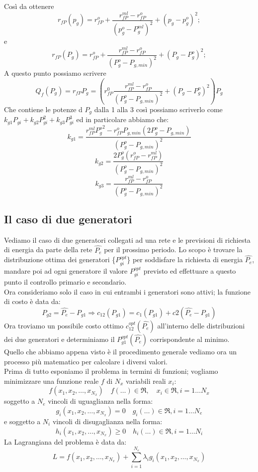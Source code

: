 Così da ottenere 
$$
r_{fP}(p_g)= r_{fP}^o+\frac{r_{fP}^{ml}-r_{fP}^o}{(p_g^o-P_g^{ml})^2}+(p_g-p_{g}^o)^2;
$$
e
$$
r_{fP}(P_g)= r_{fP}^o+\frac{r_{fP}^{ml}-r_{fP}^o}{(P_g^o-P_{g,min})^2}+(P_g-P_{g}^o)^2;
$$
A questo punto possiamo scrivere 
$$
Q_f(P_g)=r_{fP}P_g=\left (r_{fP}^0\frac{r_{fP}^{ml}-r_{fP}^o}{(P_g^o-P_{g,min})^2}+(P_g-P_{g}^o)^2\right ) P_g
$$
Che contiene le potenze d $P_g$ dalla 1 alla 3 così possiamo scriverlo come $k_{g1}P_{gi}+k_{g2}P_{gi}^2+k_{g3}P_{gi}^3$ ed in particolare abbiamo che:
$$
k_{g1}=\frac{r_{fP}^{ml}{P^o_g}^2-r_{fP}^oP_{g,min}(2P^o_g-P_{g,min})}{(P^o_g-P_{g,min})^2}
$$
$$
k_{g2}=\frac{2P^o_g(r_{fP}^{o}-r_{fP}^{ml})}{(P^o_g-P_{g,min})^2}
$$
$$
k_{g3}=\frac{r_{fP}^{ml}-r_{fP}^{o}}{(P^o_g-P_{g,min})^2}
$$

\subsection{Il caso di due generatori}
Vediamo il caso di due generatori collegati ad una rete e le previsioni di richiesta di energia da parte della rete $\hat{P_e}$ per il prossimo periodo. Lo scopo è trovare la distribuzione ottima dei generatori \{$P_{gi}^{opt}$\} per soddisfare la richiesta di energia $\hat{P_e}$, mandare poi ad ogni generatore il valore $P_{gi}^{opt}$ previsto ed effettuare a questo punto il controllo primario e secondario.\\
Ora consideriamo solo il caso in cui entrambi i generatori sono attivi; la funzione di costo è data da:
$$P_{g2}=\hat{P_e}-P_{g1} \Rightarrow c_{12}(P_{g1})= c_1(P_{g1})+c2(\hat{P_e}-P_{g1})$$
Ora troviamo un possibile costo ottimo $c_{12}^{opt}(\hat{P_e})$ all'interno delle distribuzioni dei due generatori e determiniamo il $P_{g1}^{opt}(\hat{P_e})$ corrispondente al minimo.\\
Quello che abbiamo appena visto è il procedimento generale vediamo ora un processo più matematico per calcolare i diversi valori.\\
Prima di tutto esponiamo il problema in termini di funzioni; vogliamo minimizzare una funzione reale $f$ di $N_x$ variabili reali $x_i$:
$$f(x_1,x_2,\dots,x_{N_x})\quad f(\dots)\in \Re,\quad x_i\in\Re, i=1\dots N_x$$
soggetto a $N_e$ vincoli di uguaglianza nella forma:
$$g_i(x_1,x_2,\dots,x_{N_x})=0\quad g_i(\dots)\in \Re, i=1\dots N_e$$
e soggetto a $N_i$ vincoli di disugaglianza nella forma:
$$h_i(x_1,x_2,\dots,x_{N_x})\geq 0\quad h_i(\dots)\in\Re, i=1\dots N_i$$
La Lagrangiana del problema è data da:
$$L=f(x_1,x_2,\dots,x_{N_x})+\sum_{i=1}^{N_e}\lambda_ig_i(x_1,x_2,\dots,x_{N_x})$$
